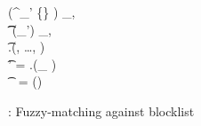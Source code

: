\begin{figure}[h]
{{{		\ro\left(\cOutputMeta{\projIdx, \vecIdx}^{\prod\limits_{\setIdx' \in \nats[\blocklistSize] \setminus \{\setIdx\}} }
		 \bmod \rsaMod \right) \oplus \ssSet_{\projIdx, \vecIdx} \\
\hspace{2cm}\label{fuzzy:dhf_detect1} \pcln \t \t \dhfOutput{\vecIdx} \assign \prg(\genericSymmKey_{\vecIdx}') \oplus \dhfSet_{\projIdx,\vecIdx} \\
\hspace{2cm}\label{fuzzy:dhf_detect2} \pcln \t \matchedIndexSet \assign \dhf.\dhfDetect(, \dots, 
\dhfOutput{\genericVecLen}) ~\quad {}\\
\hspace{2cm}\pcln \t \genericSymmKey' = 
\secretSharingScheme.\SSCombine(_{\ssIdx \in 
	\matchedIndexSet})\\
\hspace{2cm} \pcln\label{f:server:decrypt} \t \text{//} ~\clientData = 
		\decrypt[\genericSymmKey'](\cOutputFile) ~ ~\genericCInputElmt \in 
		\blocklist
}
}}
\caption{\protocolFM: Fuzzy-matching against blocklist\label{fig:fuzzy_match_no_pre}}
\end{figure}

\fi 


